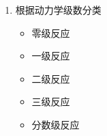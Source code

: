 \documentclass[dvipsnames, svgnames, x11names]{beamer}
\begin{document}
\begin{frame}
\begin{minipage}{0.44\linewidth}
\begin{enumerate}
              \begin{itemize}
                \item 可逆反应
                \item 不可逆反应
              \end{itemize}
            \item[7.] 根据动力学级数分类
              \begin{itemize}
                \item 零级反应
                \item 一级反应
                \item 二级反应
                \item 三级反应
                \item 分数级反应
              \end{itemize}
          \end{enumerate}
    \end{minipage}
    
\end{frame}
\end{document}
